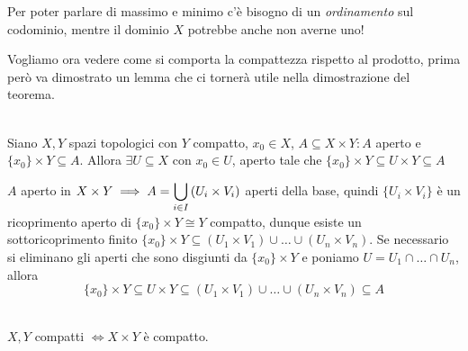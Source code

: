 \begin{observe}
	Per poter parlare di massimo e minimo c'è bisogno di un \textit{ordinamento} sul codominio, mentre il dominio $X$ potrebbe anche non averne uno!
\end{observe}
Vogliamo ora vedere come si comporta la compattezza rispetto al prodotto, prima però va dimostrato un lemma che ci tornerà utile nella dimostrazione del teorema.
\begin{lemming}~{\label{tube lemma}}\\
Siano $X,Y$ spazi topologici con $Y$ compatto, $x_0\in X$, $A\subseteq X\times Y\colon A$ aperto e $\{x_0\}\times Y\subseteq A$. Allora $\exists U\subseteq X$ con $x_0\in U$, aperto tale che $\{x_0\}\times Y \subseteq U\times Y \subseteq A$
\end{lemming}
\begin{demonstration}
	$A$ aperto in $\displaystyle X\times Y \implies A=\mathop{{\bigcup}}\displaylimits_{i\in I}\left( U_i\times V_i \right)$ aperti della base, quindi $\{U_i\times V_i\}$ è un ricoprimento aperto di $\{x_0\}\times Y \cong Y$ compatto, dunque esiste un sottoricoprimento finito $\{x_0\}\times Y\subseteq (U_1\times V_1)	\cup\dots\cup (U_n\times V_n)$. Se necessario si eliminano gli aperti che sono disgiunti da $\{x_0\}\times Y$ e poniamo $U=U_1\cap\dots\cap U_n$, allora
		\begin{equation*}
			\{x_0\}\times Y\subseteq U\times Y \subseteq (U_1\times V_1)	\cup\dots\cup (U_n\times V_n) \subseteq A
		\end{equation*}
\end{demonstration}
\begin{theorema}~{}\label{prodotto compatti}\\
$X,Y$ compatti $\iff X\times Y$ è compatto.
\end{theorema}
